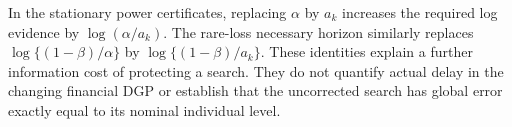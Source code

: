 In the stationary power certificates, replacing $\alpha$ by $a_k$ increases
the required log evidence by $\log(\alpha/a_k)$. The rare-loss necessary
horizon similarly replaces $\log\{(1-\beta)/\alpha\}$ by
$\log\{(1-\beta)/a_k\}$. These identities explain a further information cost
of protecting a search. They do not quantify actual delay in the changing
financial DGP or establish that the uncorrected search has global error
exactly equal to its nominal individual level.
